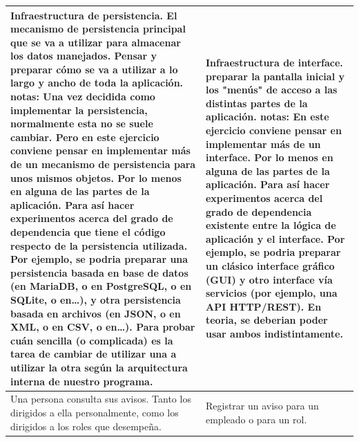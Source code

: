 \documentclass[spanish,12pt,a4paper,final,oneside]{book}
\begin{document}
\begin{longtable}{|p{7cm}|p{7cm}|}
Infraestructura de persistencia.
\newline \newline
El mecanismo de persistencia principal que se va a utilizar para almacenar los datos manejados.
\newline
Pensar y preparar cómo se va a utilizar a lo largo y ancho de toda la aplicación.
\newline \newline
notas: 
Una vez decidida como implementar la persistencia, normalmente esta no se suele cambiar.
Pero en este ejercicio conviene pensar en implementar más de un mecanismo de persistencia para unos mismos objetos. Por lo menos en alguna de las partes de la aplicación. Para así hacer experimentos acerca del grado de dependencia que tiene el código respecto de la persistencia utilizada.
\newline
Por ejemplo, se podria preparar una persistencia basada en base de datos (en MariaDB, o en PostgreSQL, o en SQLite, o en\ldots), y otra persistencia basada en archivos (en JSON, o en XML, o en CSV, o en\ldots). Para probar cuán sencilla (o complicada) es la tarea de cambiar de utilizar una a utilizar la otra según la arquitectura interna de nuestro programa.

&

Infraestructura de interface.
\newline \newline
preparar la pantalla inicial y los "menús" de acceso a las distintas partes de la aplicación.
\newline \newline
notas: 
En este ejercicio conviene pensar en implementar más de un interface. Por lo menos en alguna de las partes de la aplicación. Para así hacer experimentos acerca del grado de dependencia existente entre la lógica de aplicación y el interface.
\newline
Por ejemplo, se podria preparar un clásico interface gráfico (GUI) y otro interface vía servicios (por ejemplo, una API HTTP/REST). En teoria, se deberian poder usar ambos indistintamente.

\\ \hline

Una persona consulta sus avisos.
\newline \newline
Tanto los dirigidos a ella personalmente, como los dirigidos a los roles que desempeña.

&

Registrar un aviso para un empleado o para un rol.


\end{longtable}
\end{document}
